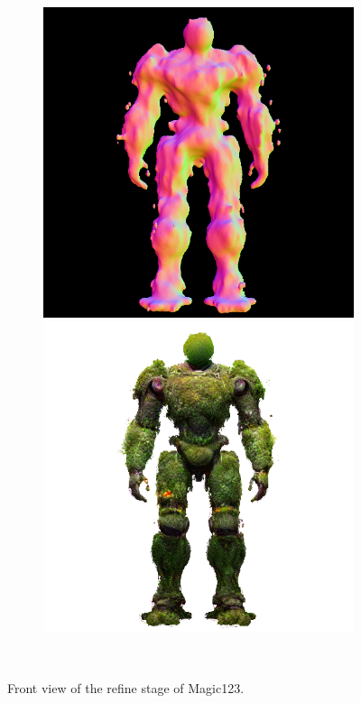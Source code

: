 \begin{figure}[H]
\begin{subfigure}[b]{0.25\textwidth}
        \caption{}
    \end{subfigure}
    \begin{subfigure}[b]{0.25\textwidth}
        \centering
        \fontsize{9pt}{7pt}\selectfont{}\vspace{.1cm}
        \includegraphics[width=\textwidth]{figures/generationProcess/magic123_refine_robot_front_10000_part2.png}
        \includegraphics[width=\textwidth]{figures/generationProcess/magic123_refine_robot_front_10000_part1.png}
        \caption{}
    \end{subfigure}
    \caption{Front view of the refine stage of Magic123.}~\label{fig:generationFrontRefineMagic123}
\end{figure}

